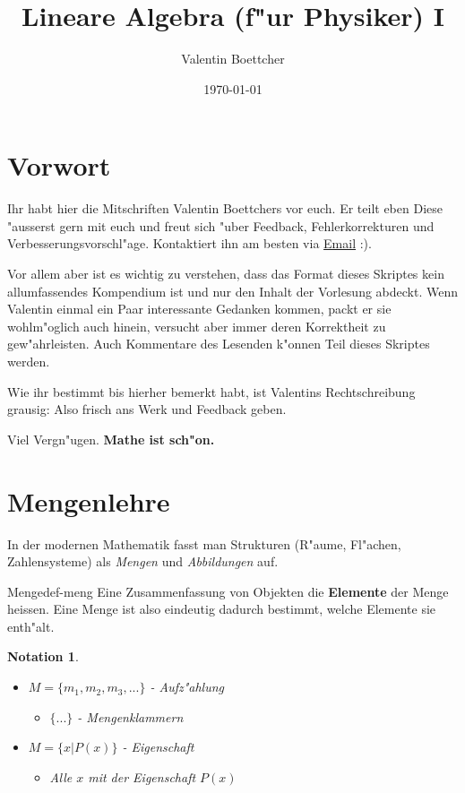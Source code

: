 \documentclass[11pt]{article}
\author{Valentin Boettcher}
\date{\today}
\title{Lineare Algebra (f"ur Physiker) I}
\newtheorem*{notation}{Notation}
\begin{document}
\maketitle
\tableofcontents

\maketitle
\newpage

\section{Vorwort}
\label{sec:org8d9fa1c}
Ihr habt hier die Mitschriften Valentin Boettchers vor euch. Er teilt eben Diese
"ausserst gern mit euch und freut sich "uber Feedback, Fehlerkorrekturen und
Verbesserungsvorschl"age. Kontaktiert ihn am besten via \href{mailto:valentin.boettcher@mailbox.tu-dresden.de}{Email} :).

Vor allem aber ist es wichtig zu verstehen, dass das Format dieses Skriptes
kein allumfassendes Kompendium ist und nur den Inhalt der Vorlesung abdeckt.
Wenn Valentin einmal ein Paar interessante Gedanken kommen, packt er sie
wohlm"oglich auch hinein, versucht aber immer deren Korrektheit zu
gew"ahrleisten. Auch Kommentare des Lesenden k"onnen Teil dieses Skriptes
werden.

Wie ihr bestimmt bis hierher bemerkt habt, ist Valentins Rechtschreibung
grausig: Also frisch ans Werk und Feedback geben.


Viel Vergn"ugen. \textbf{Mathe ist sch"on.}

\section{Mengenlehre}
\label{sec:orgd4be270}
In der modernen Mathematik fasst man Strukturen (R"aume, Fl"achen,
Zahlensysteme) als \emph{Mengen} und \emph{Abbildungen} auf.

\begin{definition}{Menge}{def-meng}
Eine Zusammenfassung von Objekten die \textbf{Elemente} der Menge heissen. Eine Menge ist
also eindeutig dadurch bestimmt, welche Elemente sie enth"alt.
\end{definition}

\begin{notation}\
\begin{itemize}
\item \(M=\{m_1,m_2,m_3,...\}\) - Aufz"ahlung
\begin{itemize}
\item \(\{...\}\) - Mengenklammern
\end{itemize}
\item \(M=\{x| P(x)\}\) - Eigenschaft
\begin{itemize}
\item Alle \(x\) mit der Eigenschaft \(P(x)\)
\end{itemize}
\end{itemize}
\end{notation}
\end{document}
